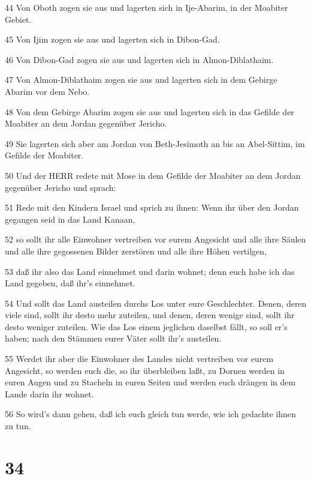 \par 44 Von Oboth zogen sie aus und lagerten sich in Ije-Abarim, in der Moabiter Gebiet.
\par 45 Von Ijim zogen sie aus und lagerten sich in Dibon-Gad.
\par 46 Von Dibon-Gad zogen sie aus und lagerten sich in Almon-Diblathaim.
\par 47 Von Almon-Diblathaim zogen sie aus und lagerten sich in dem Gebirge Abarim vor dem Nebo.
\par 48 Von dem Gebirge Abarim zogen sie aus und lagerten sich in das Gefilde der Moabiter an dem Jordan gegenüber Jericho.
\par 49 Sie lagerten sich aber am Jordan von Beth-Jesimoth an bis an Abel-Sittim, im Gefilde der Moabiter.
\par 50 Und der HERR redete mit Mose in dem Gefilde der Moabiter an dem Jordan gegenüber Jericho und sprach:
\par 51 Rede mit den Kindern Israel und sprich zu ihnen: Wenn ihr über den Jordan gegangen seid in das Land Kanaan,
\par 52 so sollt ihr alle Einwohner vertreiben vor eurem Angesicht und alle ihre Säulen und alle ihre gegossenen Bilder zerstören und alle ihre Höhen vertilgen,
\par 53 daß ihr also das Land einnehmet und darin wohnet; denn euch habe ich das Land gegeben, daß ihr's einnehmet.
\par 54 Und sollt das Land austeilen durchs Los unter eure Geschlechter. Denen, deren viele sind, sollt ihr desto mehr zuteilen, und denen, deren wenige sind, sollt ihr desto weniger zuteilen. Wie das Los einem jeglichen daselbst fällt, so soll er's haben; nach den Stämmen eurer Väter sollt ihr's austeilen.
\par 55 Werdet ihr aber die Einwohner des Landes nicht vertreiben vor eurem Angesicht, so werden euch die, so ihr überbleiben laßt, zu Dornen werden in euren Augen und zu Stacheln in euren Seiten und werden euch drängen in dem Lande darin ihr wohnet.
\par 56 So wird's dann gehen, daß ich euch gleich tun werde, wie ich gedachte ihnen zu tun.

\chapter{34}


